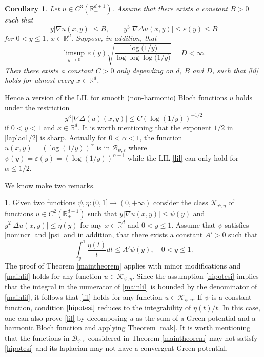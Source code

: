 \documentclass[11pt,letterpaper]{amsart}
\newtheorem{cor}{Corollary}[section]
\theoremstyle{definition}
\numberwithin{equation}{section}
\newcommand{\R}{\mathbb R}
\begin{document}
\begin{cor}\label{corlil2}
Let $u \in C^3 (\R^{d+1}_+)$. Assume that there exists a constant $B>0$ such that
$$
y |\nabla u(x,y)| \leq B , \qquad  y^3 | \nabla \Delta u (x,y)|  \leq \varepsilon (y) \leq B
$$
for $0 < y \leq 1$, $x \in \R^d$. Suppose, in addition, that
\begin{equation}\label{epsilon2}
\limsup_{y\to 0} \,  \varepsilon (y) \sqrt{\frac{\log \big ( 1/y \big )}{ \log \log \log \big ( 1/y \big )}} = D < \infty . 
\end{equation}
Then there exists a constant $C>0$ only depending on $d$, $B$ and $D$, such that \eqref{lil} holds
for almost every $x \in \R^d$.
\end{cor}

Hence a version of the LIL for smooth (non-harmonic) Bloch functions $u$ holds under the restriction 
\begin{equation}\label{laplac1/2}
y^3 |\nabla \Delta (u) (x,y)| \leq C (\log(1/y))^{-1/2}
\end{equation}
if $0<y<1$ and $x \in \R^d$. It is worth mentioning that the exponent $1/2$ in \eqref{laplac1/2} is sharp. Actually for $0< \alpha <1$, the function $u(x,y)= (\log (1/y))^{\alpha}$ is in $\mathcal{B}_{\psi , \varepsilon }$ where $\psi(y) = \varepsilon (y) = (\log (1/y))^{ \alpha - 1 }$ while the LIL \eqref{lil} can only hold for $\alpha \leq 1/2$. 

\medskip

We know make two remarks.

1. Given two functions $\psi  , \eta  : (0,1] \to (0, +\infty )$ consider the class $\mathcal{K}_{\psi, \eta}$ of functions $ u \in C^2 (\R^{d+1}_{+}) $ such that $y|\nabla u (x,y)|  \leq \psi (y)$ and $ y^2 | \Delta u(x,y)|  \leq \eta (y)$ for any $x \in \R^d$ and $0 <y\leq 1 $. Assume that $\psi$ satisfies \eqref{nonincr} and \eqref{psi} and in addition, that there exists a constant $A' >0$ such that
\begin{equation}
\label{hipotesi}
    \int_y^1 \frac{\eta (t)}{t} dt \leq A' \psi (y), \quad 0<y \leq 1. 
\end{equation}
The proof of Theorem \ref{maintheorem} applies with minor modifications and \eqref{mainlil} holds for any function $u \in \mathcal{K}_{\psi, \eta}$. Since the assumption \eqref{hipotesi} implies that the integral in the numerator of \eqref{mainlil} is bounded by the denominator of \eqref{mainlil}, it follows that \eqref{lil} holds for any function $u \in \mathcal{K}_{\psi , \eta}$. If $\psi$ is a constant function, condition $\eqref{hipotesi}$ reduces to the integrability of $\eta (t) / t$. In this case, one can also prove \eqref{lil} by decomposing $u$ as the sum of a Green potential and a harmonic Bloch function and applying Theorem \ref{mak}. It is worth mentioning that the functions in $\mathcal{B}_{\psi, \varepsilon}$ considered in Theorem \ref{maintheorem} may not satisfy \eqref{hipotesi} and its laplacian may not have a convergent Green potential.
\end{document}
